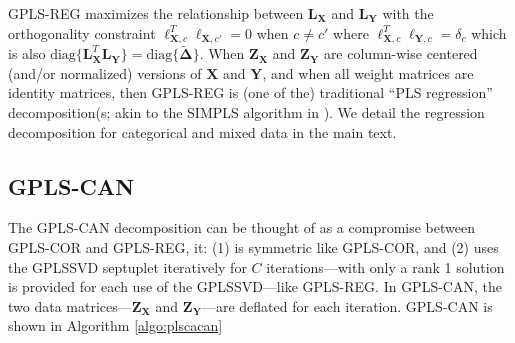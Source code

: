 \documentclass[12pt]{article}
\begin{document}
GPLS-REG maximizes the relationship between \({\mathbf L}_{\mathbf X}\)
and \({\mathbf L}_{\mathbf Y}\) with the orthogonality constraint
\({\boldsymbol \ell}_{{\mathbf X},c}^{T}{\boldsymbol \ell}_{{\mathbf X},c'} = 0\)
when \(c \neq c'\) where
\({\boldsymbol \ell}_{{\mathbf X},c}^{T}{\boldsymbol \ell}_{{\mathbf Y},c} = \delta_{c}\)
which is also
\(\mathrm{diag\{}{\mathbf L}_{\mathbf X}^{T}{\mathbf L}_{\mathbf Y}\mathrm{\}} = \mathrm{diag\{}\widetilde{\boldsymbol \Delta}\mathrm{\}}\).
When \({\mathbf Z}_{\mathbf X}\) and \({\mathbf Z}_{\mathbf Y}\) are
column-wise centered (and/or normalized) versions of \({\mathbf X}\) and
\({\mathbf Y}\), and when all weight matrices are identity matrices,
then GPLS-REG is (one of the) traditional ``PLS regression''
decomposition(s; akin to the SIMPLS algorithm in
\citet{tenenhaus_regression_1998}). We detail the regression
decomposition for categorical and mixed data in the main text.

\hypertarget{gpls-can}{%
\subsection{GPLS-CAN}\label{gpls-can}}

The GPLS-CAN decomposition can be thought of as a compromise between
GPLS-COR and GPLS-REG, it: (1) is symmetric like GPLS-COR, and (2) uses
the GPLSSVD septuplet iteratively for \(C\) iterations---with only a
rank 1 solution is provided for each use of the GPLSSVD---like GPLS-REG.
In GPLS-CAN, the two data matrices---\({\mathbf Z}_{\mathbf X}\) and
\({\mathbf Z}_{\mathbf Y}\)---are deflated for each iteration. GPLS-CAN
is shown in Algorithm \ref{algo:plscacan}
\end{document}
